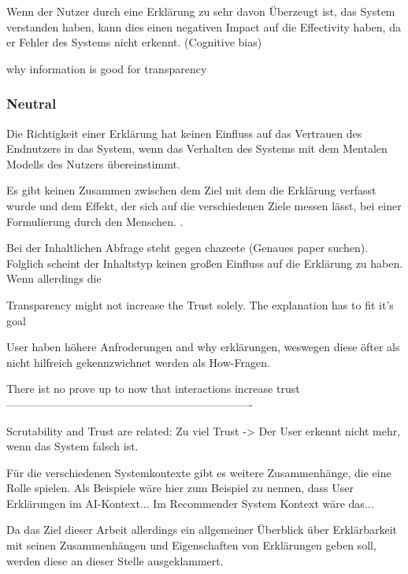Wenn der Nutzer durch eine Erklärung zu sehr davon Überzeugt ist, das System verstanden haben, kann dies einen negativen Impact auf die Effectivity haben, da er Fehler des Systems nicht erkennt. (Cognitive bias) \cite{kohl_explainability_2019}

why information is good for transparency \cite{chazette2020explainability}

\subsubsection*{Neutral}

Die Richtigkeit einer Erklärung hat keinen Einfluss auf das Vertrauen des Endnutzers in das System, wenn das Verhalten des Systems mit dem Mentalen Modells des Nutzers übereinstimmt. \cite{eiband_impact_2019, riveiro_thats_2021}

Es gibt keinen Zusammen zwischen dem Ziel mit dem die Erklärung verfasst wurde und dem Effekt, der sich auf die verschiedenen Ziele messen lässt, bei einer Formulierung durch den Menschen. \cite{balog_measuring_2020}.

Bei der Inhaltlichen Abfrage steht \cite{zahedi_towards_2019} gegen chazeete (Genaues paper suchen). Folglich scheint der Inhaltstyp keinen großen Einfluss auf die Erklärung zu haben. Wenn allerdings die 

Transparency might not increase the Trust solely. The explanation has to fit it's goal \cite{wiegand2019drive}

User haben höhere Anfroderungen and why erklärungen, weswegen diese öfter als nicht hilfreich gekennzwichnet werden als How-Fragen. \cite{lim_2009_assessing}

There ist no prove up to now that interactions increase trust \cite{cheng2019explaining}
-------------------------------------------------------------------

Scrutability and Trust are related: Zu viel Trust -> Der User erkennt nicht mehr, wenn das System falsch ist. \cite{gunning2019darpa}

Für die verschiedenen Systemkontexte gibt es weitere Zusammenhänge, die eine Rolle spielen. Als Beispiele wäre hier zum Beispiel zu nennen, dass User Erklärungen im AI-Kontext... Im Recommender System Kontext wäre das...

Da das Ziel dieser Arbeit allerdings ein allgemeiner Überblick über Erklärbarkeit mit seinen Zusammenhängen und Eigenschaften von Erklärungen geben soll, werden diese an dieser Stelle ausgeklammert.

